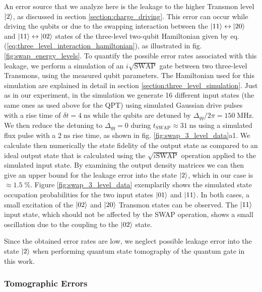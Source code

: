 An error source that we analyze here is the leakage to the higher Transmon level $\left| 2 \right>$, as discussed in section \ref{section:charge_driving}. This error can occur while driving the qubits or due to the swapping interaction between the $\left| 11 \right>\leftrightarrow\left| 20 \right>$ and $\left| 11 \right>\leftrightarrow\left| 02 \right>$ states of the three-level two-qubit Hamiltonian given by eq. (\ref{eq:three_level_interaction_hamiltonian}), as illustrated in fig. \ref{fig:swap_energy_levels}. To quantify the possible error rates associated with this leakage, we perform a simulation of an $i\sqrt{\mathrm{SWAP}}$ gate between two three-level Transmons, using the measured qubit parameters. The Hamiltonian used for this simulation are explained in detail in section \ref{section:three_level_simulation}. Just as in our experiment, in the simulation we generate 16 different input states (the same ones as used above for the QPT) using simulated Gaussian drive pulses with a rise time of $\delta t = 4\;\mathrm{ns}$ while the qubits are detuned by $\Delta_{qq}/2\pi = 150\;\mathrm{MHz}$. We then reduce the detuning to $\Delta_{qq} = 0$ during $t_\mathrm{SWAP}\approx 31 \;\mathrm{ns}$ using a simulated flux pulse with a $2\;\mathrm{ns}$ rise time, as shown in fig. \ref{fig:swap_3_level_data}a1. We calculate then numerically the state fidelity of the output state as compared to an ideal output state that is calculated using the $\sqrt{i\mathrm{SWAP}}$ operation applied to the simulated input state. By examining the output density matrices we can then give an upper bound for the leakage error into the state $\left| 2 \right>$, which in our case is $\approx 1.5\;\%$. Figure \ref{fig:swap_3_level_data} exemplarily shows the simulated state occupation probabilities for the two input states $\left| 01 \right>$ and $\left| 11 \right>$. In both cases, a small excitation of the $\left| 02 \right>$ and $\left| 20 \right>$ Transmon states can be observed. The $\left| 11 \right>$ input state, which should not be affected by the SWAP operation, shows a small oscillation due to the coupling to the $\left| 02 \right>$ state.

\smallskip

Since the obtained error rates are low, we neglect possible leakage error into the state $\left| 2 \right>$ when performing quantum state tomography of the quantum gate in this work.

\subsubsection{Tomographic Errors} \label{section:tomographic_errors}


